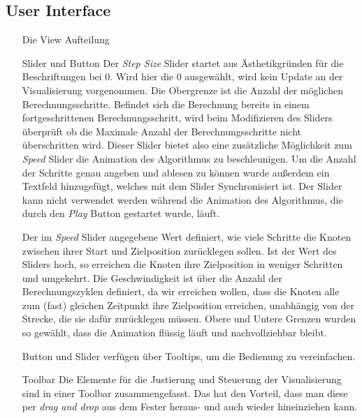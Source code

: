\subsection*{User Interface}
\begin{enumerate}
    \item[Die View] Aufteilung
    \item[Slider und Button] Der \textit{Step Size} Slider startet aus Ästhetikgründen für die Beschriftungen bei 0. Wird hier die 0 ausgewählt, wird kein Update an der Visualisierung vorgenommen. Die Obergrenze ist die Anzahl der möglichen  Berechnungsschritte. Befindet sich die Berechnung bereits in einem fortgeschrittenen Berechnungsschritt, wird beim Modifizieren des Sliders überprüft ob die Maximale Anzahl der Berechnungsschritte nicht überschritten wird. Dieser Slider bietet also eine zusätzliche Möglichkeit zum \textit{Speed} Slider die Animation des Algorithmus zu beschleunigen. Um die Anzahl der Schritte genau angeben und ablesen zu können wurde außerdem ein Textfeld hinzugefügt, welches mit dem Slider Synchronisiert ist. Der Slider kann nicht verwendet werden während die Animation des Algorithmus, die durch den \textit{Play} Button gestartet wurde, läuft. 
    
    Der im \textit{Speed} Slider angegebene Wert definiert, wie viele Schritte die Knoten zwischen ihrer Start und Zielposition zurücklegen sollen. Ist der Wert des Sliders hoch, so erreichen die Knoten ihre Zielposition in weniger Schritten und umgekehrt. Die Geschwindigkeit ist über die Anzahl der Berechnungszyklen definiert, da wir erreichen wollen, dass die  Knoten alle zum (fast) gleichen Zeitpunkt ihre Zielposition erreichen, unabhängig von der Strecke, die sie dafür zurücklegen müssen. Obere und Untere Grenzen wurden so gewählt, dass die Animation flüssig läuft und nachvollziehbar bleibt.
    
    Button und Slider verfügen über Tooltips, um die Bedienung zu vereinfachen.
    
    \item[Toolbar] Die Elemente für die Justierung und Steuerung der Visualisierung sind in einer Toolbar zusammengefasst. Das hat den Vorteil, dass man diese per \textit{drag and drop} aus dem Fester heraus- und auch wieder hineinziehen kann.
    
\end{enumerate}


